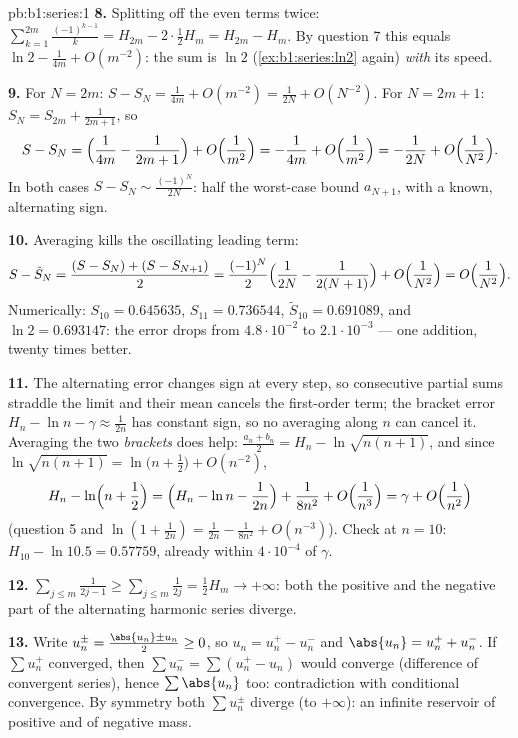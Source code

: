 \begin{solution}{pb:b1:series:1}
\textbf{8.} Splitting off the even terms twice:
$\sum_{k=1}^{2m}\frac{(-1)^{k-1}}{k} = H_{2m} - 2\cdot\frac12
H_m = H_{2m} - H_m$. By question 7 this equals $\ln 2 -
\frac{1}{4m} + O(m^{-2})$: the sum is $\ln 2$
(\cref{ex:b1:series:ln2} again) \emph{with} its speed.

\textbf{9.} For $N = 2m$: $S - S_N = \frac{1}{4m} + O(m^{-2}) =
\frac{1}{2N} + O(N^{-2})$. For $N = 2m + 1$: $S_{N} = S_{2m} +
\frac{1}{2m+1}$, so
\[
S - S_N = \Bigl(\frac{1}{4m} - \frac{1}{2m+1}\Bigr) +
O\Bigl(\frac{1}{m^2}\Bigr)
= -\frac{1}{4m} + O\Bigl(\frac{1}{m^2}\Bigr)
= -\frac{1}{2N} + O\Bigl(\frac{1}{N^2}\Bigr).
\]
In both cases $S - S_N \sim \frac{(-1)^N}{2N}$: half the
worst-case bound $a_{N+1}$, with a known, alternating sign.

\textbf{10.} Averaging kills the oscillating leading term:
\[
S - \tilde S_N = \frac{(S - S_N) + (S - S_{N+1})}{2}
= \frac{(-1)^N}{2}\Bigl(\frac{1}{2N} - \frac{1}{2(N+1)}\Bigr)
+ O\Bigl(\frac{1}{N^2}\Bigr) = O\Bigl(\frac{1}{N^2}\Bigr).
\]
Numerically: $S_{10} = 0.645635$, $S_{11} = 0.736544$, $\tilde
S_{10} = 0.691089$, and $\ln 2 = 0.693147$: the error drops from
$4.8\cdot10^{-2}$ to $2.1\cdot10^{-3}$ --- one addition, twenty
times better.

\textbf{11.} The alternating error changes sign at every step,
so consecutive partial sums straddle the limit and their mean
cancels the first-order term; the bracket error $H_n - \ln n -
\gamma \approx \frac{1}{2n}$ has constant sign, so no averaging
along $n$ can cancel it. Averaging the two \emph{brackets} does
help: $\frac{a_n + b_n}{2} = H_n - \ln\sqrt{n(n+1)}$, and since
$\ln\sqrt{n(n+1)} = \ln\bigl(n + \frac12\bigr) + O(n^{-2})$,
\[
H_n - \ln\Bigl(n + \frac12\Bigr)
= \Bigl(H_n - \ln n - \frac{1}{2n}\Bigr) + \frac{1}{8n^2} +
O\Bigl(\frac{1}{n^3}\Bigr) = \gamma + O\Bigl(\frac{1}{n^2}\Bigr)
\]
(question 5 and $\ln(1 + \frac{1}{2n}) = \frac{1}{2n} -
\frac{1}{8n^2} + O(n^{-3})$). Check at $n = 10$: $H_{10} -
\ln 10.5 = 0.57759$, already within $4\cdot10^{-4}$ of
$\gamma$.

\textbf{12.} $\sum_{j\leq m} \frac{1}{2j-1} \geq \sum_{j \leq m}
\frac{1}{2j} = \frac12 H_m \to +\infty$: both the positive and
the negative part of the alternating harmonic series diverge.

\textbf{13.} Write $u_n^\pm = \frac{\abs{u_n} \pm u_n}{2} \geq
0$, so $u_n = u_n^+ - u_n^-$ and $\abs{u_n} = u_n^+ + u_n^-$. If
$\sum u_n^+$ converged, then $\sum u_n^- = \sum (u_n^+ - u_n)$
would converge (difference of convergent series), hence $\sum
\abs{u_n}$ too: contradiction with conditional convergence. By
symmetry both $\sum u_n^\pm$ diverge (to $+\infty$): an infinite
reservoir of positive and of negative mass.


\end{solution}
